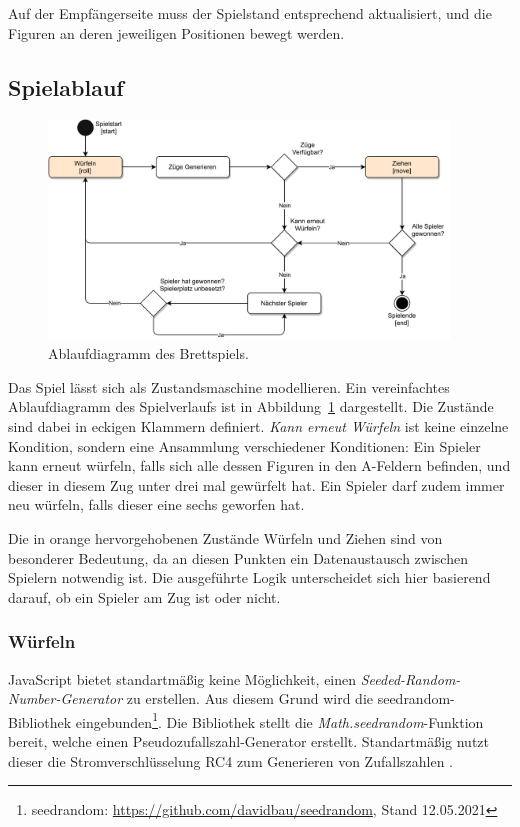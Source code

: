 Auf der Empfängerseite muss der Spielstand entsprechend aktualisiert, und die Figuren an deren jeweiligen Positionen bewegt werden.

\subsection{Spielablauf}
\begin{figure}[h]
\centering
\includegraphics[width=0.95\textwidth]{bilder/PDF_SVG/MAEDN_ABLAUF.pdf}
\caption{Ablaufdiagramm des Brettspiels.}
\label{fig:maednablauf}
\end{figure}

Das Spiel lässt sich als Zustandsmaschine modellieren. Ein vereinfachtes Ablaufdiagramm des Spielverlaufs ist in Abbildung~\ref{fig:maednablauf} dargestellt. Die \glqq{}Zustände\grqq{} sind dabei in eckigen Klammern definiert. \textit{Kann erneut Würfeln} ist keine einzelne Kondition, sondern eine Ansammlung verschiedener Konditionen: Ein Spieler kann erneut würfeln, falls sich alle dessen Figuren in den A-Feldern befinden, und dieser in diesem Zug unter drei mal gewürfelt hat. Ein Spieler darf zudem immer neu würfeln, falls dieser eine sechs geworfen hat.

Die in orange hervorgehobenen Zustände \glqq{}Würfeln\grqq{} und \glqq{}Ziehen\grqq{} sind von besonderer Bedeutung, da an diesen Punkten ein Datenaustausch zwischen Spielern notwendig ist. Die ausgeführte Logik unterscheidet sich hier basierend darauf, ob ein Spieler am Zug ist oder nicht.\par

\subsubsection{Würfeln}
JavaScript bietet standartmäßig keine Möglichkeit, einen \textit{Seeded-Random-Number-Generator} zu erstellen. Aus diesem Grund wird die \glqq{}seedrandom\grqq{}-Bibliothek eingebunden\footnote{seedrandom: \url{https://github.com/davidbau/seedrandom}, Stand 12.05.2021}. Die Bibliothek stellt die \textit{Math.seedrandom}-Funktion bereit, welche einen Pseudozufallszahl-Generator erstellt. Standartmäßig nutzt dieser die Stromverschlüsselung \acf{RC4} zum Generieren von Zufallszahlen \cite{seedrandom}.

